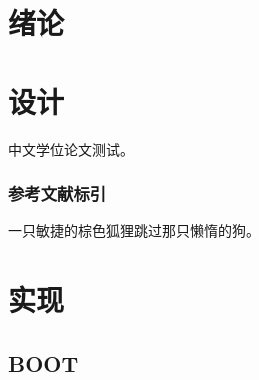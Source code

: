 
\iffalse
\fi


\chapter{绪论}

\chapter{设计}



中文学位论文测试\cite{zhang2010tree}。

\subsection{参考文献标引}

一只敏捷的棕色狐狸跳过那只懒惰的狗\cite{deng:01a}。

\chapter{实现}

\section{BOOT}
